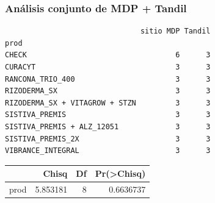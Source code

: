 \documentclass[
  letterpaper,
  DIV=11,
  numbers=noendperiod]{scrartcl}
\begin{document}
\hypertarget{anuxe1lisis-conjunto-de-mdp-tandil}{%
\subsubsection{Análisis conjunto de MDP +
Tandil}\label{anuxe1lisis-conjunto-de-mdp-tandil}}

\begin{verbatim}
                               sitio MDP Tandil
prod                                           
CHECK                                  6      3
CURACYT                                3      3
RANCONA_TRIO_400                       3      3
RIZODERMA_SX                           3      3
RIZODERMA_SX + VITAGROW + STZN         3      3
SISTIVA_PREMIS                         3      3
SISTIVA_PREMIS + ALZ_12051             3      3
SISTIVA_PREMIS_2X                      3      3
VIBRANCE_INTEGRAL                      3      3
\end{verbatim}

\begin{longtable}[]{@{}lrrr@{}}
\toprule()
& Chisq & Df & Pr(\textgreater Chisq) \\
\midrule()
\endhead
prod & 5.853181 & 8 & 0.6636737 \\
\bottomrule()
\end{longtable}
\end{document}
